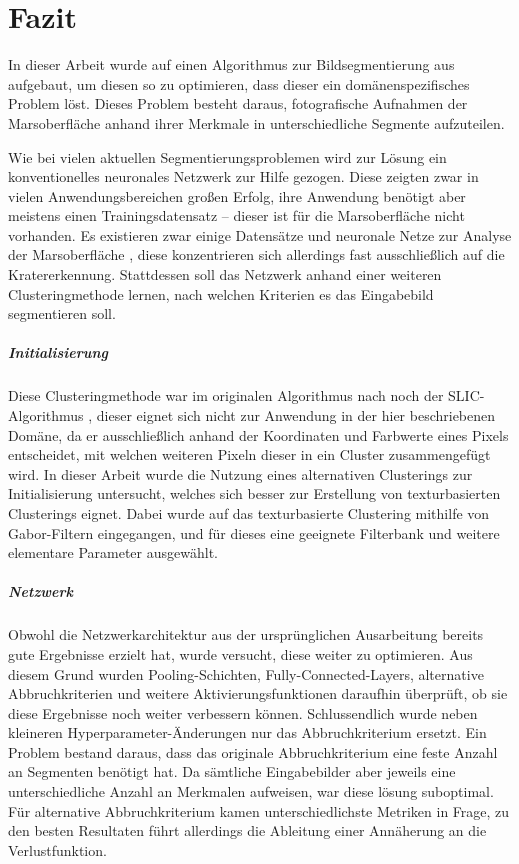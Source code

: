 \chapter{Fazit}
\label{chap:fazit}
In dieser Arbeit wurde auf einen Algorithmus zur Bildsegmentierung aus \cite{kanezaki_18} aufgebaut, um diesen so zu optimieren, dass dieser ein domänenspezifisches Problem löst. Dieses Problem besteht daraus, fotografische Aufnahmen der Marsoberfläche anhand ihrer Merkmale in unterschiedliche Segmente aufzuteilen.

Wie bei vielen aktuellen Segmentierungsproblemen wird zur Lösung ein konventionelles neuronales Netzwerk zur Hilfe gezogen. Diese zeigten zwar in vielen Anwendungsbereichen großen Erfolg, ihre Anwendung benötigt aber meistens einen Trainingsdatensatz -- dieser ist für die Marsoberfläche nicht vorhanden. Es existieren zwar einige Datensätze und neuronale Netze zur Analyse der Marsoberfläche \cite{cohen_16}, diese konzentrieren sich allerdings fast ausschließlich auf die Kratererkennung. Stattdessen soll das Netzwerk anhand einer weiteren Clusteringmethode lernen, nach welchen Kriterien es das Eingabebild segmentieren soll.

\paragraph{Initialisierung} Diese Clusteringmethode war im originalen Algorithmus nach \cite{kanezaki_18} noch der SLIC-Algorithmus \cite{achanta_10}, dieser eignet sich nicht zur Anwendung in der hier beschriebenen Domäne, da er ausschließlich anhand der Koordinaten und Farbwerte eines Pixels entscheidet, mit welchen weiteren Pixeln dieser in ein Cluster zusammengefügt wird. In dieser Arbeit wurde die Nutzung eines alternativen Clusterings zur Initialisierung untersucht, welches sich besser zur Erstellung von texturbasierten Clusterings eignet. Dabei wurde auf das texturbasierte Clustering mithilfe von Gabor-Filtern \cite{jain_91} eingegangen, und für dieses eine geeignete Filterbank und weitere elementare Parameter ausgewählt.

\paragraph{Netzwerk} Obwohl die Netzwerkarchitektur aus der ursprünglichen Ausarbeitung \cite{kanezaki_18} bereits gute Ergebnisse erzielt hat, wurde versucht, diese weiter zu optimieren. Aus diesem Grund wurden Pooling-Schichten, Fully-Connected-Layers, alternative Abbruchkriterien und weitere Aktivierungsfunktionen daraufhin überprüft, ob sie diese Ergebnisse noch weiter verbessern können. Schlussendlich wurde neben kleineren Hyperparameter-Änderungen nur das Abbruchkriterium ersetzt. Ein Problem bestand daraus, dass das originale Abbruchkriterium eine feste Anzahl an Segmenten benötigt hat. Da sämtliche Eingabebilder aber jeweils eine unterschiedliche Anzahl an Merkmalen aufweisen, war diese lösung suboptimal. Für alternative Abbruchkriterium kamen unterschiedlichste Metriken in Frage, zu den besten Resultaten führt allerdings die Ableitung einer Annäherung an die Verlustfunktion.

